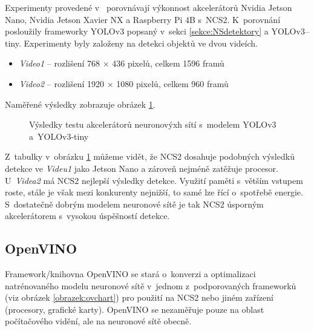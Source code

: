 Experimenty provedené v~\cite{ncs2testYolo} porovnávají výkonnost akcelerátorů Nvidia Jetson Nano, Nvidia Jetson Xavier NX a Raspberry Pi 4B s~NCS2. K~porovnání posloužily frameworky YOLOv3 popsaný v~sekci \ref{sekce:NSdetektory} a YOLOv3--tiny. Experimenty byly založeny na detekci objektů ve dvou videích.
\begin{itemize}
  \item \emph{Video1} -- rozlišení 768 $\times$ 436 pixelů, celkem 1596 framů
  \item \emph{Video2} -- rozlišení 1920 $\times$ 1080 pixelů, celkem 960 framů 
\end{itemize}

Naměřené výsledky zobrazuje obrázek \ref{obrazek:ncs2test}.

\begin{figure}[H]
  \begin{center}
  \label{obrazek:ncs2test}
  \caption{Výsledky testu akcelerátorů neuronovýxh sítí s~modelem YOLOv3 a~YOLOv3-tiny \cite{ncs2testYolo}}
  \end{center}
\end{figure}

Z~tabulky v~obrázku \ref{obrazek:ncs2test} můžeme vidět, že NCS2 dosahuje podobných výsledků detekce ve \emph{Videu1} jako Jetson Nano a zároveň nejméně zatěžuje procesor. U~\emph{Videa2} má NCS2 nejlepší výsledky detekce. Využití paměti s~větším vstupem roste, stále je však mezi konkurenty nejnižší, to samé lze řící o~spotřebě energie. S~dostatečně dobrým modelem neuronové sítě je tak NCS2 úsporným akcelerátorem s~vysokou úspěšností detekce.


\subsection*{OpenVINO}
Framework/knihovna OpenVINO se stará o~konverzi a optimalizaci natrénovaného modelu neuronové sítě v~jednom z~podporovaných frameworků (viz obrázek \ref{obrazek:ovchart}) pro použití na NCS2 nebo jiném zařízení (procesory, grafické karty). OpenVINO se nezaměřuje pouze na oblast počítačového vidění, ale na neuronové sítě obecně.

